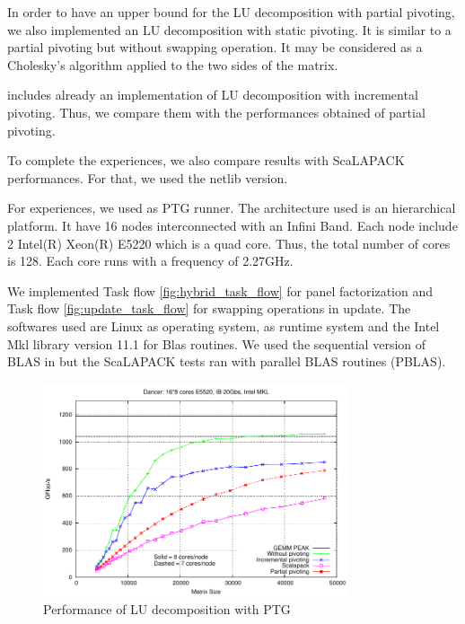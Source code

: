 In order to have an upper bound for the LU decomposition with partial pivoting, we also implemented an LU decomposition with static pivoting. It is similar to a partial pivoting but without swapping operation. It may be considered as a Cholesky's algorithm applied to the two sides of the matrix.

\dague includes already an implementation of LU decomposition with incremental pivoting. Thus, we compare them with the performances obtained of partial pivoting.

To complete the experiences, we also compare results with ScaLAPACK performances. For that, we used the netlib version.

For experiences, we used \dague as PTG runner. The architecture used is an hierarchical platform. It have 16 nodes interconnected with an Infini Band. Each node include  2 Intel(R) Xeon(R) E5220 which is a quad core. Thus, the  total number of cores is 128. Each core runs with a frequency of 2.27GHz. 

We implemented Task flow \ref{fig:hybrid_task_flow} for panel factorization and Task flow \ref{fig:update_task_flow} for swapping operations in update. The softwares used are Linux as operating system, \dague as runtime system and the Intel Mkl library version 11.1 for Blas routines. We used the sequential version of BLAS in \dague but the ScaLAPACK tests ran with parallel BLAS routines (PBLAS).

\begin{figure}
\centering
\includegraphics[width=0.8\textwidth]{figures/gepp.pdf}
\caption{Performance of LU decomposition with PTG\label{fig:pp}} 
\end{figure}

